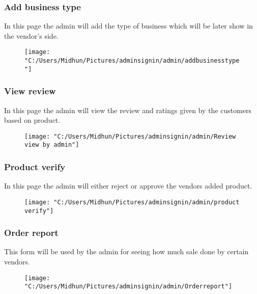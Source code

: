 \documentclass{beamer}
\begin{document}
\begin{frame}

\subsubsection{Add business type}
In this page the admin will add the type of business which will be later show in the vendor's side.

\begin{figure}[bph]
	\centering
	\texttt{[image: "C:/Users/Midhun/Pictures/adminsignin/admin/addbusinesstype"]}
	\label{fig:admin-signin}
\end{figure}
\end{frame}

\begin{frame}
	
	\subsubsection{View review}
	In this page the admin will view the review and ratings given by the customers based on product.
	\begin{figure}[bph]
		\centering
		\texttt{[image: "C:/Users/Midhun/Pictures/adminsignin/admin/Review view by admin"]}
		\label{fig:admin-signin}
	\end{figure}
\end{frame}

\begin{frame}
	\subsubsection{Product verify}
	In this page the admin will either reject or approve the vendors added product.
	
	\begin{figure}[bph]
		\centering
		\texttt{[image: "C:/Users/Midhun/Pictures/adminsignin/admin/product verify"]}
		\label{fig:admin-signin}
	\end{figure}
	
	
\end{frame}

\begin{frame}\subsubsection{Order report}
	This form will be used by the admin for seeing how much sale done by certain vendors.
	\begin{figure}[bph]
		\centering
		\texttt{[image: "C:/Users/Midhun/Pictures/adminsignin/admin/Orderreport"]}
		\label{fig:admin-signin}
	\end{figure}
	
\end{frame}
\end{document}
